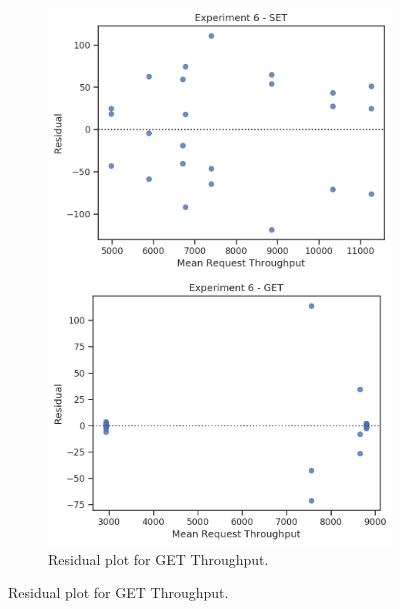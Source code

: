     \begin{figure}
        \vspace*{-.5\baselineskip}
            \centering
        \begin{subfigure}[t!]{0.45\textwidth}
            \centering
            \includegraphics[width=\textwidth]{../data_analysis/figures/6-0_throughput-set-residual.png}
            \caption{Residual plot for SET Throughput.\label{fig:6_r_set_tp}}
            \includegraphics[width=\textwidth]{../data_analysis/figures/6-0_throughput-get-residual.png}
            \caption{Residual plot for GET Throughput.\label{fig:6_r_get_tp}}
        \end{subfigure}

\end{figure}
